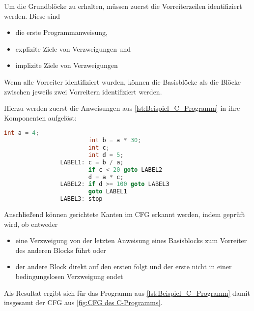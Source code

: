             Um die Grundblöcke zu erhalten,
            müssen zuerst die Vorreiterzeilen identifiziert werden.\cite[9]{Kulkarni2011} Diese sind

            \begin{itemize}
                \item die erste Programmanweisung,
                \item explizite Ziele von Verzweigungen und
                \item implizite Ziele von Verzweigungen
            \end{itemize}

            Wenn alle Vorreiter identifiziert wurden,
            können die Basisblöcke als die Blöcke zwischen jeweils zwei Vorreitern identifiziert werden.

            Hierzu werden zuerst die Anweisungen aus
            \vref{lst:Beispiel_C_Programm} in ihre Komponenten aufgelöst:

            \begin{lstlisting}[caption={Auflösung in die Komponenten}, label={lst:Aufl_sung_in_die_Komponenten}, gobble=16, language=c]
                        int a = 4;
                        int b = a * 30;
                        int c;
                        int d = 5;
                LABEL1: c = b / a;
                        if c < 20 goto LABEL2
                        d = a * c;
                LABEL2: if d >= 100 goto LABEL3
                        goto LABEL1
                LABEL3: stop
            \end{lstlisting}

            Anschließend können gerichtete Kanten im
            \gls{CFG} erkannt werden,
            indem geprüft wird,
            ob entweder

            \begin{itemize}
                \item eine Verzweigung von der letzten Anweisung eines Basisblocks zum Vorreiter des anderen Blocks führt oder
                \item der andere Block direkt auf den ersten folgt und
                      der erste nicht in einer bedingungslosen Verzweigung endet
            \end{itemize}

            Als Resultat ergibt sich für das Programm aus
            \vref{lst:Beispiel_C_Programm} damit insgesamt der
            \gls{CFG} aus
            \vref{fig:CFG des C-Programms}.

